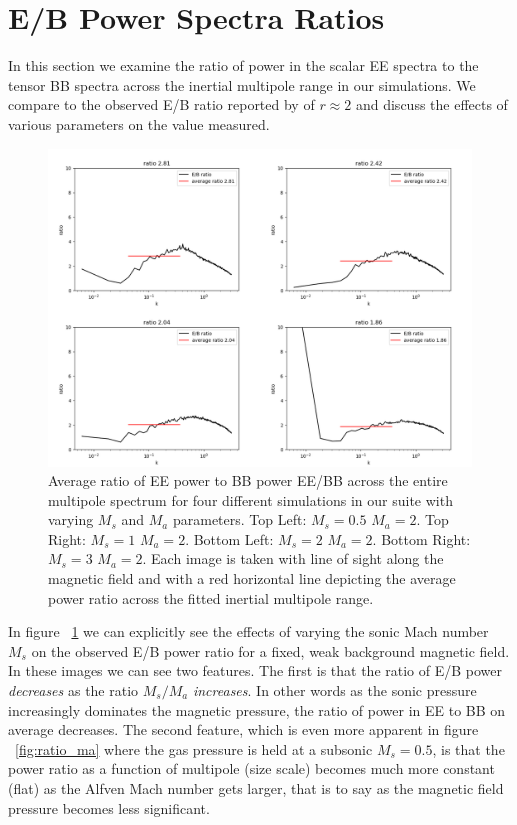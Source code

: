 \section{E/B Power Spectra Ratios}

In this section we examine the ratio of power in the scalar EE spectra to the
tensor BB spectra across the inertial multipole range in our simulations.
We compare to the observed E/B ratio reported by \citep{Planck18XI} of
$r \approx 2$ and discuss the effects of various parameters on the value measured. 

\begin{figure}[h]
\includegraphics[width=\linewidth]{diff_ratios_x.png}
\caption{Average ratio of EE power to BB power EE/BB across the entire multipole
spectrum for four different simulations in our suite with varying $M_s$ and
$M_a$ parameters. Top Left: $M_s=0.5$ $M_a=2$. Top Right: $M_s=1$ $M_a=2$.
Bottom Left: $M_s=2$ $M_a=2$. Bottom Right: $M_s=3$ $M_a=2$. Each image is taken
with line of sight along the magnetic field and with a red horizontal line
depicting the average power ratio across the fitted inertial multipole range.}
\label{fig:ratio_ms}
\end{figure}

In figure ~\ref{fig:ratio_ms} we can explicitly see the effects of varying the
sonic Mach number $M_s$ on the observed E/B power ratio for a fixed, weak
background magnetic field. In these images we can see two features. The first is
that the ratio of E/B power \emph{decreases} as the ratio $M_{s} / M_{a}$
\emph{increases}. In other words as the sonic pressure increasingly dominates
the magnetic pressure, the ratio of power in EE to BB on average decreases. The
second feature, which is even more apparent in figure ~\ref{fig:ratio_ma} where
the gas pressure is held at a subsonic $M_s = 0.5$, is that the
power ratio as a function of multipole (size scale) becomes much more constant
(flat)  as the Alfven Mach number gets larger, that is to say as the magnetic field
pressure becomes less significant.

